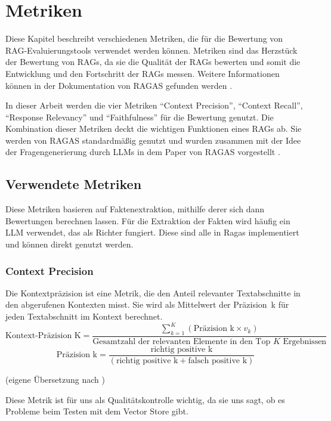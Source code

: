 \section{Metriken}
\label{chap:metrics}
Diese Kapitel beschreibt verschiedenen Metriken, die für die Bewertung von RAG-Evaluierungstools verwendet werden können.
Metriken sind das Herzstück der Bewertung von RAGs, da sie die Qualität der RAGs bewerten und somit die Entwicklung und den Fortschritt der RAGs messen.
Weitere Informationen können in der Dokumentation von RAGAS gefunden werden \cite{ragas_metrics_2025}.

In dieser Arbeit werden die vier Metriken \enquote{Context Precision}, \enquote{Context Recall}, \enquote{Response Relevancy} und \enquote{Faithfulness} für die Bewertung genutzt.
Die Kombination dieser Metriken deckt die wichtigen Funktionen eines RAGs ab. Sie werden von RAGAS standardmäßig genutzt und wurden zusammen mit der Idee der Fragengenerierung durch LLMs in dem Paper von RAGAS vorgestellt \cite{es-etal-2024-ragas}.

\subsection{Verwendete Metriken}
Diese Metriken basieren auf Faktenextraktion, mithilfe derer sich dann Bewertungen berechnen lassen.
Für die Extraktion der Fakten wird häufig ein LLM verwendet, das als Richter fungiert.
Diese sind alle in Ragas implementiert und können direkt genutzt werden.

\subsubsection{Context Precision}
\begin{plainquote}
Die Kontextpräzision ist eine Metrik, die den Anteil relevanter Textabschnitte in den abgerufenen Kontexten misst.
Sie wird als Mittelwert der Präzision~k für jeden Textabschnitt im Kontext berechnet.
$$\text{Kontext-Präzision~K} = \frac{\sum_{k=1}^{K}{(\text{Präzision~k} \times v_k)}}{\text{Gesamtzahl der relevanten Elemente in den Top } K \text{ Ergebnissen}}$$
$$\text{Präzision~k} = \frac{\text{richtig positive~k}}{(\text{richtig positive~k} + \text{falsch positive~k})}$$

(eigene Übersetzung nach \cite{ragas_context_precision})
\end{plainquote}

Diese Metrik ist für uns als Qualitätskontrolle wichtig, da sie uns sagt, ob es Probleme beim Testen mit dem Vector Store gibt.

